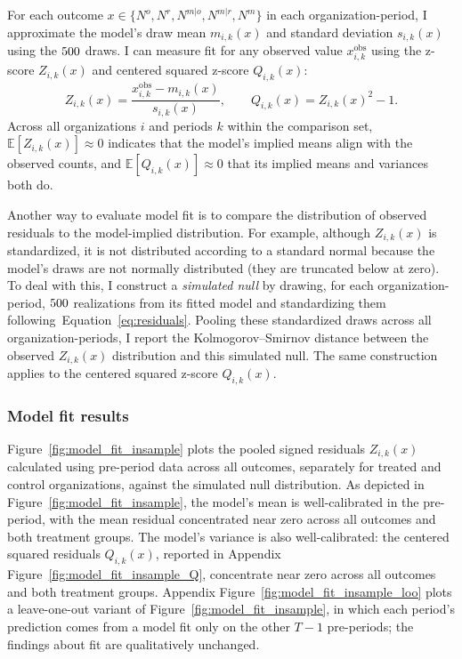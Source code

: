 \documentclass[12pt,notitlepage]{article}
\begin{document}
For each outcome $x \in \{N^o, N^r, N^{m|o}, N^{m|r}, N^m\}$ in each organization-period, I approximate the model's draw mean $m_{i,k}(x)$ and standard deviation $s_{i,k}(x)$ using the $500$ draws.
I can measure fit for any observed value $x_{i,k}^{\mathrm{obs}}$ using the z-score $Z_{i,k}(x)$ and centered squared z-score $Q_{i,k}(x)$:
\begin{equation}\label{eq:residuals}
Z_{i,k}(x) = \frac{x_{i,k}^{\mathrm{obs}} - m_{i,k}(x)}{s_{i,k}(x)}, \qquad Q_{i,k}(x) = Z_{i,k}(x)^2 - 1.
\end{equation}
Across all organizations $i$ and periods $k$ within the comparison set, $\mathbb{E}[Z_{i,k}(x)]\approx 0$ indicates that the model's implied means align with the observed counts, and $\mathbb{E}[Q_{i,k}(x)]\approx 0$ that its implied means and variances both do.

Another way to evaluate model fit is to compare the distribution of observed residuals to the model-implied distribution.
For example, although $Z_{i,k}(x)$ is standardized, it is not distributed according to a standard normal because the model's draws are not normally distributed (they are truncated below at zero).
To deal with this, I construct a \emph{simulated null} by drawing, for each organization-period, $500$ realizations from its fitted model and standardizing them following~Equation~\ref{eq:residuals}.
Pooling these standardized draws across all organization-periods, I report the Kolmogorov--Smirnov distance between the observed $Z_{i,k}(x)$ distribution and this simulated null.
The same construction applies to the centered squared z-score $Q_{i,k}(x)$.

\subsubsection{Model fit results}\label{sec:model_fit_results}

Figure~\ref{fig:model_fit_insample} plots the pooled signed residuals $Z_{i,k}(x)$ calculated using pre-period data across all outcomes, separately for treated and control organizations, against the simulated null distribution.
As depicted in Figure~\ref{fig:model_fit_insample}, the model's mean is well-calibrated in the pre-period, with the mean residual concentrated near zero across all outcomes and both treatment groups.
The model's variance is also well-calibrated: the centered squared residuals $Q_{i,k}(x)$, reported in Appendix Figure~\ref{fig:model_fit_insample_Q}, concentrate near zero across all outcomes and both treatment groups.
Appendix Figure~\ref{fig:model_fit_insample_loo} plots a leave-one-out variant of Figure~\ref{fig:model_fit_insample}, in which each period's prediction comes from a model fit only on the other $T-1$ pre-periods; the findings about fit are qualitatively unchanged.
\end{document}
